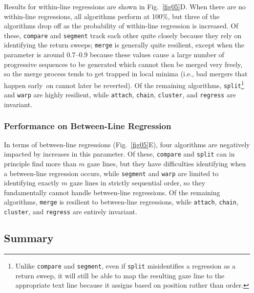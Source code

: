 \documentclass[doc,biblatex]{apa7}
\begin{document}
Results for within-line regressions are shown in Fig.~\ref{fig05}D. When there are no within-line regressions, all algorithms perform at 100\%, but three of the algorithms drop off as the probability of within-line regression is increased. Of these, \texttt{compare} and \texttt{segment} track each other quite closely because they rely on identifying the return sweeps; \texttt{merge} is generally quite resilient, except when the parameter is around 0.7--0.9 because these values cause a large number of progressive sequences to be generated which cannot then be merged very freely, so the merge process tends to get trapped in local minima (i.e., bad mergers that happen early~on cannot later be reverted). Of the remaining algorithms, \texttt{split}\footnote{Unlike \texttt{compare} and \texttt{segment}, even if \texttt{split} misidentifies a regression as a return sweep, it will still be able to map the resulting gaze line to the appropriate text line because it assigns based on position rather than order.} and \texttt{warp} are highly resilient, while \texttt{attach}, \texttt{chain}, \texttt{cluster}, and \texttt{regress} are invariant.

\subsubsection{Performance on Between-Line Regression}

In terms of between-line regressions (Fig.~\ref{fig05}E), four algorithms are negatively impacted by increases in this parameter. Of these, \texttt{compare} and \texttt{split} can in principle find more than $m$ gaze lines, but they have difficulties identifying when a between-line regression occurs, while \texttt{segment} and \texttt{warp} are limited to identifying exactly $m$ gaze lines in strictly sequential order, so they fundamentally cannot handle between-line regressions. Of the remaining algorithms, \texttt{merge} is resilient to between-line regressions, while \texttt{attach}, \texttt{chain}, \texttt{cluster}, and \texttt{regress} are entirely invariant.

\subsection{Summary}
\end{document}
